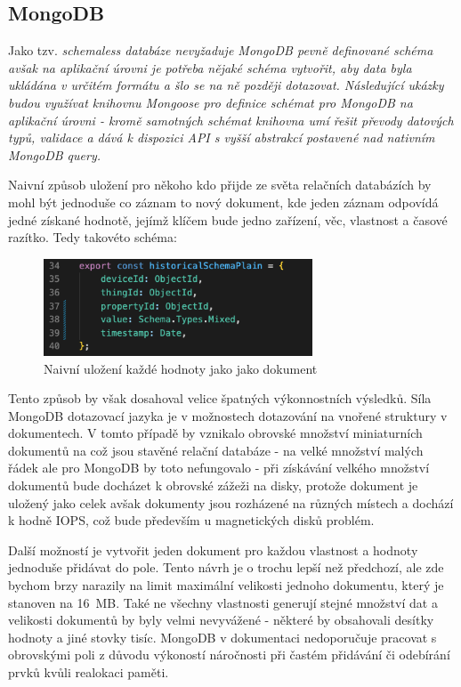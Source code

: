 \documentclass{article}
\begin{document}
\subsection{MongoDB}
Jako tzv. \it{schemaless} databáze nevyžaduje MongoDB pevně definované schéma avšak na aplikační úrovni je potřeba nějaké schéma vytvořit, aby data byla ukládána v určitém formátu a šlo se na ně později dotazovat. Následující ukázky budou využívat knihovnu Mongoose pro definice schémat pro MongoDB na aplikační úrovni - kromě samotných schémat knihovna umí řešit převody datových typů, validace a dává k dispozici API s vyšší abstrakcí postavené nad nativním \it{MongoDB query}.

Naivní způsob uložení pro někoho kdo přijde ze světa relačních databázích by mohl být jednoduše co záznam to nový dokument, kde jeden záznam odpovídá jedné získané hodnotě, jejímž klíčem bude jedno zařízení, věc, vlastnost a časové razítko. Tedy takovéto schéma:

\begin{figure}[htbp]
\includegraphics[width=8cm]{images/naive_schema.png}
\centering
\caption{Naivní uložení každé hodnoty jako jako dokument}
\end{figure}

Tento způsob by však dosahoval velice špatných výkonnostních výsledků. Síla MongoDB dotazovací jazyka je v možnostech dotazování na vnořené struktury v dokumentech. V tomto případě by vznikalo obrovské množství miniaturních dokumentů na což jsou stavěné relační databáze - na velké množství malých řádek ale pro MongoDB by toto nefungovalo - při získávání velkého množství dokumentů bude docházet k obrovské zážeži na disky, protože dokument je uložený jako celek avšak dokumenty jsou rozházené na různých místech a dochází k hodně IOPS, což bude především u magnetických disků problém.

Další možností je vytvořit jeden dokument pro každou vlastnost a hodnoty jednoduše přidávat do pole. Tento návrh je o trochu lepší než předchozí, ale zde bychom brzy narazily na limit maximální velikosti jednoho dokumentu, který je stanoven na 16~MB. Také ne všechny vlastnosti generují stejné množství dat a velikosti dokumentů by byly velmi nevyvážené - některé by obsahovali desítky hodnoty a jiné stovky tisíc. MongoDB v dokumentaci nedoporučuje pracovat s obrovskými poli z důvodu výkoností náročnosti při častém přidávání či odebírání prvků kvůli realokaci paměti.
\end{document}
